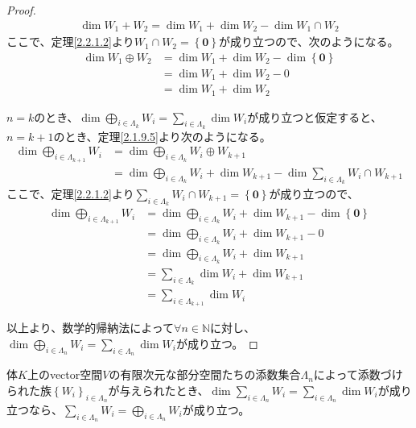 \documentclass[dvipdfmx]{jsarticle}
\begin{document}
\begin{proof}
\begin{align*}
\dim{W_{1} + W_{2}} = \dim W_{1} + \dim W_{2} - \dim{W_{1} \cap W_{2}}
\end{align*}
ここで、定理\ref{2.2.1.2}より$W_{1} \cap W_{2} = \left\{ \mathbf{0} \right\}$が成り立つので、次のようになる。
\begin{align*}
\dim{W_{1} \oplus W_{2}} &= \dim W_{1} + \dim W_{2} - \dim\left\{ \mathbf{0} \right\}\\
&= \dim W_{1} + \dim W_{2} - 0\\
&= \dim W_{1} + \dim W_{2}
\end{align*}\par
$n = k$のとき、$\dim{\bigoplus_{i \in \varLambda_{k}} W_{i}} = \sum_{i \in \varLambda_{k}} {\dim W_{i}}$が成り立つと仮定すると、$n = k + 1$のとき、定理\ref{2.1.9.5}より次のようになる。
\begin{align*}
\dim{\bigoplus_{i \in \varLambda_{k + 1}} W_{i}} &= \dim{\bigoplus_{i \in \varLambda_{k}} W_{i} \oplus W_{k + 1}}\\
&= \dim{\bigoplus_{i \in \varLambda_{k}} W_{i}} + \dim W_{k + 1} - \dim{\sum_{i \in \varLambda_{k}} W_{i} \cap W_{k + 1}}
\end{align*}
ここで、定理\ref{2.2.1.2}より$\sum_{i \in \varLambda_{k}} W_{i} \cap W_{k + 1} = \left\{ \mathbf{0} \right\}$が成り立つので、
\begin{align*}
\dim{\bigoplus_{i \in \varLambda_{k + 1}} W_{i}} &= \dim{\bigoplus_{i \in \varLambda_{k}} W_{i}} + \dim W_{k + 1} - \dim\left\{ \mathbf{0} \right\}\\
&= \dim{\bigoplus_{i \in \varLambda_{k}} W_{i}} + \dim W_{k + 1} - 0\\
&= \dim{\bigoplus_{i \in \varLambda_{k}} W_{i}} + \dim W_{k + 1}\\
&= \sum_{i \in \varLambda_{k}} {\dim W_{i}} + \dim W_{k + 1}\\
&= \sum_{i \in \varLambda_{k + 1}} {\dim W_{i}}
\end{align*}\par
以上より、数学的帰納法によって$\forall n \in \mathbb{N}$に対し、$\dim{\bigoplus_{i \in \varLambda_{n}} W_{i}} = \sum_{i \in \varLambda_{n}} {\dim W_{i}}$が成り立つ。
\end{proof}
\begin{thm}\label{2.2.1.4}
体$K$上のvector空間$V$の有限次元な部分空間たちの添数集合$\varLambda_{n}$によって添数づけられた族$\left\{ W_{i} \right\}_{i \in \varLambda_{n}}$が与えられたとき、$\dim{\sum_{i \in \varLambda_{n}} W_{i}} = \sum_{i \in \varLambda_{n}} {\dim W_{i}}$が成り立つなら、$\sum_{i \in \varLambda_{n}} W_{i} = \bigoplus_{i \in \varLambda_{n}} W_{i}$が成り立つ。
\end{thm}
\end{document}
